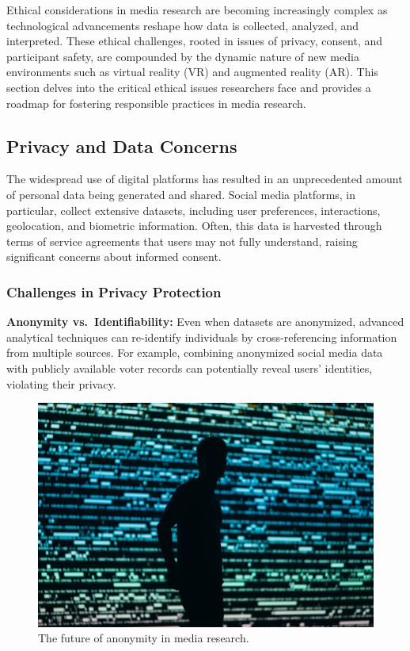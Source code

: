 \documentclass[
]{book}
\begin{document}
Ethical considerations in media research are becoming increasingly complex as technological advancements reshape how data is collected, analyzed, and interpreted. These ethical challenges, rooted in issues of privacy, consent, and participant safety, are compounded by the dynamic nature of new media environments such as virtual reality (VR) and augmented reality (AR). This section delves into the critical ethical issues researchers face and provides a roadmap for fostering responsible practices in media research.

\subsection{Privacy and Data Concerns}\label{privacy-and-data-concerns}

The widespread use of digital platforms has resulted in an unprecedented amount of personal data being generated and shared. Social media platforms, in particular, collect extensive datasets, including user preferences, interactions, geolocation, and biometric information. Often, this data is harvested through terms of service agreements that users may not fully understand, raising significant concerns about informed consent.

\subsubsection{Challenges in Privacy Protection}\label{challenges-in-privacy-protection}

\textbf{Anonymity vs.~Identifiability:} Even when datasets are anonymized, advanced analytical techniques can re-identify individuals by cross-referencing information from multiple sources. For example, combining anonymized social media data with publicly available voter records can potentially reveal users' identities, violating their privacy.

\begin{figure}
\centering
\includegraphics[width=1\textwidth,height=\textheight]{images/anon-ident.jpg}
\caption{The future of anonymity in media research.}
\end{figure}
\end{document}
